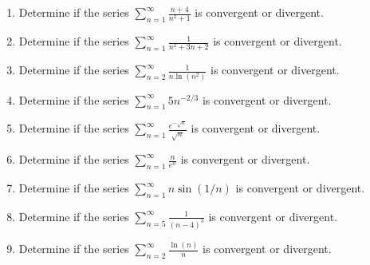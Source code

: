 \documentclass[12pt]{article}
\begin{document}
\begin{enumerate}
    \item Determine if the series $\sum_{n=1}^{\infty} \frac{n+4}{n^2+1}$ is convergent or divergent.
    \item Determine if the series $\sum_{n=1}^{\infty} \frac{1}{n^2+3n+2}$ is convergent or divergent.
    \item Determine if the series $\sum_{n=2}^{\infty} \frac{1}{n \ln(n^2)}$ is convergent or divergent.
    \item Determine if the series $\sum_{n=1}^{\infty} 5n^{-2/3}$ is convergent or divergent.
    \item Determine if the series $\sum_{n=1}^{\infty} \frac{e^{-\sqrt{n}}}{\sqrt{n}}$ is convergent or divergent.
    \item Determine if the series $\sum_{n=1}^{\infty} \frac{n}{e^n}$ is convergent or divergent.
    \item Determine if the series $\sum_{n=1}^{\infty} n \sin(1/n)$ is convergent or divergent.
    \item Determine if the series $\sum_{n=5}^{\infty} \frac{1}{(n-4)^3}$ is convergent or divergent.
    \item Determine if the series $\sum_{n=2}^{\infty} \frac{\ln(n)}{n}$ is convergent or divergent.
\end{enumerate}

\newpage
\end{document}

